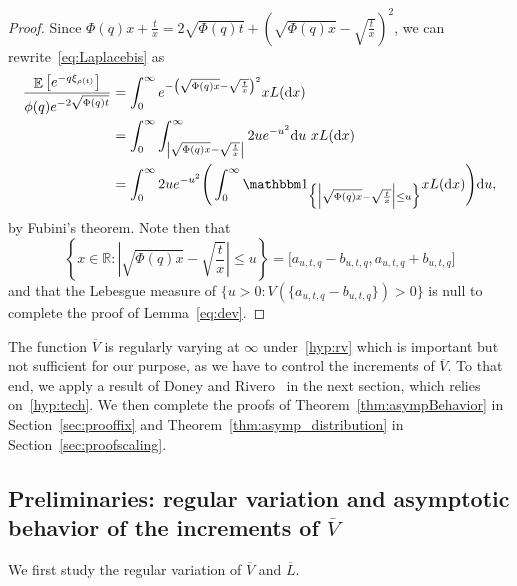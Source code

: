 \documentclass[AHL,Unicode,longabstracts,published]{cedram}
\newcommand{\R}{\mathbb{R}}
\DeclareMathOperator{\E}{\mathbb{E}}
\newcommand{\dd}{\mathrm{d}}
\renewcommand{\bar}[1]{\overline{#1}}
\begin{document}
\begin{proof}
Since $\Phi(q)x + \frac{t}{x} = 2 \sqrt{\Phi(q)t} + (\sqrt{\Phi(q)x}-\sqrt{\frac{t}{x}})^2$, we can rewrite~\eqref{eq:Laplacebis} as
\begin{align*}
\frac{\E\left[e^{-q\xi_{\rho(t)}}\right]}{\phi(q) e^{-2 \sqrt{\Phi(q)t}}} &= \int_0^\infty e^{-\left(\sqrt{\Phi(q)x}-\sqrt{\frac{t}{x}}\right)^2} x L(\dd x)\\
&= \int_0^{\infty} \int_{\left|\sqrt{\Phi(q)x}-\sqrt{\frac{t}{x}}\right|}^{\infty}2ue^{-u^2} \dd u \ xL(\dd x)\\
&= \int_0^{\infty} 2ue^{-u^2} \Bigg(\int_0^{\infty} \mathbbm 1_{\Big\{\Big|\sqrt{\Phi(q)x}-\sqrt{\frac{t}{x}}\Big| \leq u\Big\}} xL(\dd x)\Bigg) \dd u,
\end{align*}
by Fubini's theorem. Note then that
\[
\left\{x \in \R : \left|\sqrt{\Phi(q)x}-\sqrt{\frac{t}{x}}\right| \leq u\right\} = \big[a_{u,t,q}-b_{u,t,q},a_{u,t,q}+b_{u,t,q}\big]
\]
and that the Lebesgue measure of $\{u>0:V(\{a_{u,t,q}-b_{u,t,q}\})>0\}$ is null to complete the proof of Lemma~\ref{eq:dev}.
\end{proof}



The function $\bar V$ is regularly varying at $\infty$ under~\eqref{hyp:rv} which is important but not sufficient for our purpose, as we have to control the increments of $\bar V$. To that end, we apply a result of Doney and Rivero~\cite{DR13} in the next section, which relies on~\eqref{hyp:tech}. We then complete the proofs of Theorem~\ref{thm:asympBehavior} in Section~\ref{sec:prooffix} and Theorem~\ref{thm:asymp_distribution} in Section~\ref{sec:proofscaling}.


\subsection{Preliminaries: regular variation and asymptotic behavior of the increments of \texorpdfstring{$\bar V$}{V}}\label{sec:incrementsofV}

We first study the regular variation of $\bar V$ and $\bar{L}$.
\end{document}
